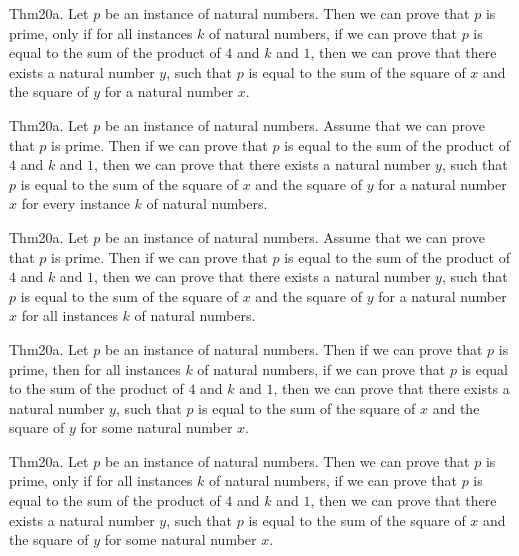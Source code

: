 \documentclass{article}
\begin{document}
Thm20a. Let $p$ be an instance of natural numbers. Then we can prove that $p$ is prime, only if for all instances $k$ of natural numbers, if we can prove that $p$ is equal to the sum of the product of $4$ and $k$ and $1$, then we can prove that there exists a natural number $y$, such that $p$ is equal to the sum of the square of $x$ and the square of $y$ for a natural number $x$.

Thm20a. Let $p$ be an instance of natural numbers. Assume that we can prove that $p$ is prime. Then if we can prove that $p$ is equal to the sum of the product of $4$ and $k$ and $1$, then we can prove that there exists a natural number $y$, such that $p$ is equal to the sum of the square of $x$ and the square of $y$ for a natural number $x$ for every instance $k$ of natural numbers.

Thm20a. Let $p$ be an instance of natural numbers. Assume that we can prove that $p$ is prime. Then if we can prove that $p$ is equal to the sum of the product of $4$ and $k$ and $1$, then we can prove that there exists a natural number $y$, such that $p$ is equal to the sum of the square of $x$ and the square of $y$ for a natural number $x$ for all instances $k$ of natural numbers.

Thm20a. Let $p$ be an instance of natural numbers. Then if we can prove that $p$ is prime, then for all instances $k$ of natural numbers, if we can prove that $p$ is equal to the sum of the product of $4$ and $k$ and $1$, then we can prove that there exists a natural number $y$, such that $p$ is equal to the sum of the square of $x$ and the square of $y$ for some natural number $x$.

Thm20a. Let $p$ be an instance of natural numbers. Then we can prove that $p$ is prime, only if for all instances $k$ of natural numbers, if we can prove that $p$ is equal to the sum of the product of $4$ and $k$ and $1$, then we can prove that there exists a natural number $y$, such that $p$ is equal to the sum of the square of $x$ and the square of $y$ for some natural number $x$.
\end{document}
